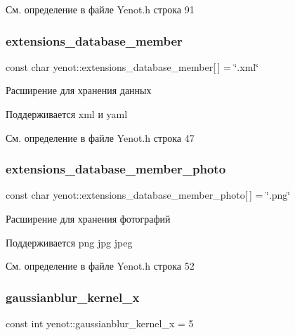 См. определение в файле Yenot.\+h строка 91

\mbox{\label{namespaceyenot_a33ac96c1605ea0acb1f29aaf1ace51da}} 
\subsubsection{\texorpdfstring{extensions\+\_\+database\+\_\+member}{extensions\_database\_member}}
{\footnotesize\ttfamily const char yenot\+::extensions\+\_\+database\+\_\+member\mbox{[}$\,$\mbox{]} = \char`\"{}.xml\char`\"{}}

Расширение для хранения данных

Поддерживается xml и yaml 

См. определение в файле Yenot.\+h строка 47

\mbox{\label{namespaceyenot_aad9119112273f919a9be40dd3cd6f883}} 
\subsubsection{\texorpdfstring{extensions\+\_\+database\+\_\+member\+\_\+photo}{extensions\_database\_member\_photo}}
{\footnotesize\ttfamily const char yenot\+::extensions\+\_\+database\+\_\+member\+\_\+photo\mbox{[}$\,$\mbox{]} = \char`\"{}.png\char`\"{}}

Расширение для хранения фотографий

Поддерживается png jpg jpeg 

См. определение в файле Yenot.\+h строка 52

\mbox{\label{namespaceyenot_a7b716ae635492024820f16eb8c04a385}} 
\subsubsection{\texorpdfstring{gaussianblur\+\_\+kernel\+\_\+x}{gaussianblur\_kernel\_x}}
{\footnotesize\ttfamily const int yenot\+::gaussianblur\+\_\+kernel\+\_\+x = 5}

